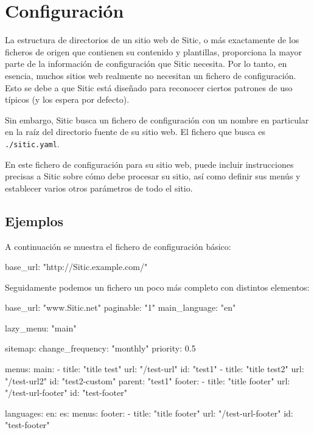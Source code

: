 
\section{Configuración}

La estructura de directorios de un sitio web de Sitic, o más exactamente de los ficheros de origen
que contienen su contenido y plantillas, proporciona la mayor parte de la información de configuración
que Sitic necesita. Por lo tanto, en esencia, muchos sitios web realmente no necesitan un fichero de
configuración. Esto se debe a que Sitic está diseñado para reconocer ciertos patrones de uso típicos
(y los espera por defecto).

Sin embargo, Sitic busca un fichero de configuración con un nombre en particular en la raíz del directorio
fuente de su sitio web. El fichero que busca es \texttt{./sitic.yaml}.

En este fichero de configuración para su sitio web, puede incluir instrucciones precisas a Sitic sobre cómo
debe procesar su sitio, así como definir sus menús y establecer varios otros parámetros de todo el sitio.

\subsection{Ejemplos}

A continuación se muestra el fichero de configuración básico:

\begin{yamlcode}
base_url: "http://Sitic.example.com/"
\end{yamlcode}

Seguidamente podemos un fichero un poco más completo con distintos elementos:

\begin{yamlcode}
base_url: "www.Sitic.net"
paginable: "1"
main_language: "en"

lazy_menu: "main"

sitemap:
    change_frequency: "monthly"
    priority: 0.5

menus:
    main:
        - title: "title test"
          url: "/test-url"
          id: "test1"
        - title: "title test2"
          url: "/test-url2"
          id: "test2-custom"
          parent: "test1"
    footer:
        - title: "title footer"
          url: "/test-url-footer"
          id: "test-footer"


languages:
    en:
    es:
        menus:
            footer:
                - title: "title footer"
                  url: "/test-url-footer"
                  id: "test-footer"
\end{yamlcode}

